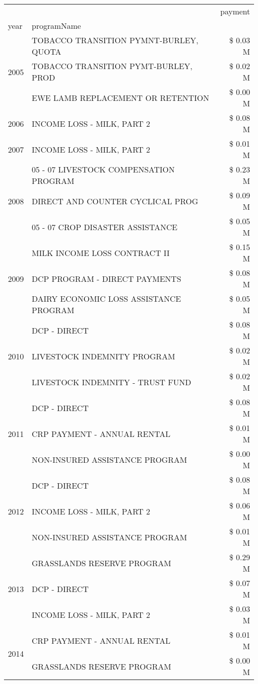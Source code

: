 \begin{tabular}{llr}
\toprule
 &  & payment \\
year & programName &  \\
\midrule
\multirow[t]{3}{*}{2005} & TOBACCO TRANSITION PYMNT-BURLEY, QUOTA & \$ 0.03 M \\
 & TOBACCO TRANSITION PYMT-BURLEY, PROD & \$ 0.02 M \\
 & EWE LAMB REPLACEMENT OR RETENTION & \$ 0.00 M \\
\cline{1-3}
2006 & INCOME LOSS - MILK, PART 2 & \$ 0.08 M \\
\cline{1-3}
2007 & INCOME LOSS - MILK, PART 2 & \$ 0.01 M \\
\cline{1-3}
\multirow[t]{3}{*}{2008} & 05 - 07 LIVESTOCK COMPENSATION PROGRAM & \$ 0.23 M \\
 & DIRECT AND COUNTER CYCLICAL PROG & \$ 0.09 M \\
 & 05 - 07 CROP DISASTER ASSISTANCE & \$ 0.05 M \\
\cline{1-3}
\multirow[t]{3}{*}{2009} & MILK INCOME LOSS CONTRACT II & \$ 0.15 M \\
 & DCP PROGRAM - DIRECT PAYMENTS & \$ 0.08 M \\
 & DAIRY ECONOMIC LOSS ASSISTANCE PROGRAM & \$ 0.05 M \\
\cline{1-3}
\multirow[t]{3}{*}{2010} & DCP - DIRECT & \$ 0.08 M \\
 & LIVESTOCK INDEMNITY PROGRAM & \$ 0.02 M \\
 & LIVESTOCK INDEMNITY - TRUST FUND & \$ 0.02 M \\
\cline{1-3}
\multirow[t]{3}{*}{2011} & DCP - DIRECT & \$ 0.08 M \\
 & CRP PAYMENT - ANNUAL RENTAL & \$ 0.01 M \\
 & NON-INSURED ASSISTANCE PROGRAM & \$ 0.00 M \\
\cline{1-3}
\multirow[t]{3}{*}{2012} & DCP - DIRECT & \$ 0.08 M \\
 & INCOME LOSS - MILK, PART 2 & \$ 0.06 M \\
 & NON-INSURED ASSISTANCE PROGRAM & \$ 0.01 M \\
\cline{1-3}
\multirow[t]{3}{*}{2013} & GRASSLANDS RESERVE PROGRAM & \$ 0.29 M \\
 & DCP - DIRECT & \$ 0.07 M \\
 & INCOME LOSS - MILK, PART 2 & \$ 0.03 M \\
\cline{1-3}
\multirow[t]{3}{*}{2014} & CRP PAYMENT - ANNUAL RENTAL & \$ 0.01 M \\
 & GRASSLANDS RESERVE PROGRAM & \$ 0.00 M \\

\end{tabular}
